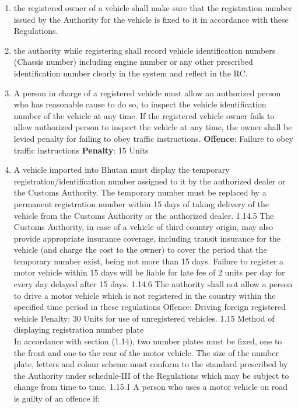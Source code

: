 \documentclass[
]{book}
\begin{document}
\begin{enumerate}
\def\labelenumi{\alph{enumi}.}
\item
  the registered owner of a vehicle shall make sure that the registration number issued by the Authority for the vehicle is fixed to it in accordance with these Regulations.
\item
  the authority while registering shall record vehicle identification numbers (Chassis number) including engine number or any other prescribed identification number clearly in the system and reflect in the RC.
\item
  A person in charge of a registered vehicle must allow an authorized person who has reasonable cause to do so, to inspect the vehicle identification number of the vehicle at any time. If the registered vehicle owner fails to allow authorized person to inspect the vehicle at any time, the owner shall be levied penalty for failing to obey traffic instructions.
  \textbf{Offence}: Failure to obey traffic instructions
  \textbf{Penalty}: 15 Units
\item
  A vehicle imported into Bhutan must display the temporary registration/identification number assigned to it by the authorized dealer or the Customs Authority. The temporary number must be replaced by a permanent registration number within 15 days of taking delivery of the vehicle from the Customs Authority or the authorized dealer.
  1.14.5 The Customs Authority, in case of a vehicle of third country origin, may also provide appropriate insurance coverage, including transit insurance for the vehicle (and charge the cost to the owner) to cover the period that the temporary number exist, being not more than 15 days. Failure to register a motor vehicle within 15 days will be liable for late fee of 2 units per day for every day delayed after 15 days.
  1.14.6 The authority shall not allow a person to drive a motor vehicle which is not registered in the country within the specified time period in these regulations
  Offence: Driving foreign registered vehicle
  Penalty: 30 Units for use of unregistered vehicles.
  1.15 Method of displaying registration number plate\\
  In accordance with section (1.14), two number plates must be fixed, one to the front and one to the rear of the motor vehicle. The size of the number plate, letters and colour scheme must conform to the standard prescribed by the Authority under schedule-III of the Regulations which may be subject to change from time to time.
  1.15.1 A person who uses a motor vehicle on road is guilty of an offence if:

\end{enumerate}
\end{document}
